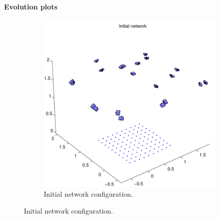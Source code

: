\documentclass{article}
\begin{document}
\paragraph{Evolution plots}

\begin{figure}
  \centering
  \begin{subfigure}[b]{0.7\textwidth}
    \includegraphics[width=\textwidth]{ill/ccamx0}
    \caption{Initial network configuration.}
    \label{fig:camx0}
  \end{subfigure}%


\end{figure}
\end{document}

